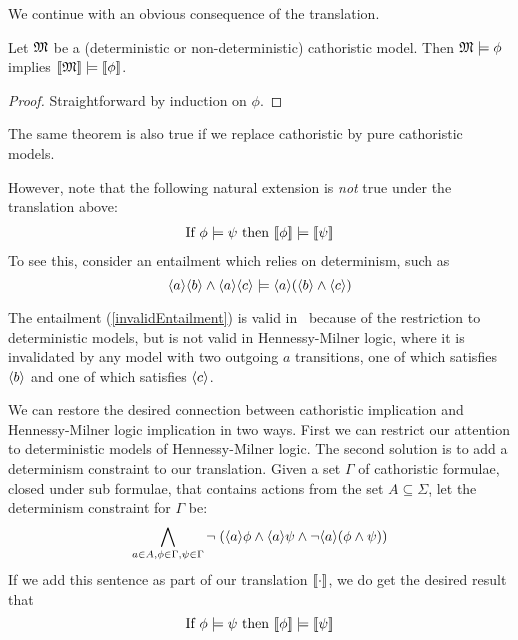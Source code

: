 We continue with an obvious consequence of the translation.

\begin{theorem}
Let $\frak{M}$ be a (deterministic or non-deterministic) cathoristic
  model. Then $\frak{M} \models \phi$ implies $\lbrack\!\lbrack \frak{M} \rbrack\!\rbrack \models
  \lbrack\!\lbrack \phi \rbrack\!\rbrack$.
\end{theorem}
\begin{proof}
Straightforward by induction on $\phi$.
\end{proof}

\NI The same theorem is also true if we replace cathoristic by pure cathoristic
models.

However, note that the following natural extension is \emph{not} true
under the translation above:
\begin{align}
\text{If } \phi \models \psi \text{ then } \lbrack\!\lbrack \phi \rbrack\!\rbrack \models \lbrack\!\lbrack \psi \rbrack\!\rbrack
\label{invalidEntailment}
\end{align}
To see this, consider an entailment which relies on determinism, such as
\[
\langle a \rangle \langle b \rangle \land \langle a \rangle \langle c \rangle \models \langle a \rangle (\langle b \rangle \land \langle c \rangle )
\]

\NI The entailment (\ref{invalidEntailment}) is valid in \cathoristic\ because of
the restriction to deterministic models, but is not valid in
Hennessy-Milner logic, where it is invalidated by any model with two
outgoing $a$ transitions, one of which satisfies $\MAY{b}$ and one of
which satisfies $\MAY{c}$.

We can restore the desired connection between cathoristic implication and
Hennessy-Milner logic implication in two ways. First we can restrict
our attention to deterministic models of Hennessy-Milner logic.  The
second solution is to add a determinism constraint to our
translation. Given a set $\Gamma$ of cathoristic formulae, closed under
sub formulae, that contains actions from the set $A \subseteq \Sigma$,
let the determinism constraint for $\Gamma$ be:
\[
\bigwedge_{a \in A, \phi \in \Gamma, \psi \in \Gamma} \neg \; (\langle a \rangle \phi \land \langle a \rangle \psi \land \neg \langle a \rangle (\phi \land \psi) )
\]
If we add this sentence as part of our translation $\lbrack\!\lbrack \cdot \rbrack\!\rbrack$, we
do get the desired result that
\[
\text{If } \phi \models \psi \text{ then } \lbrack\!\lbrack \phi \rbrack\!\rbrack \models \lbrack\!\lbrack \psi \rbrack\!\rbrack
\]



